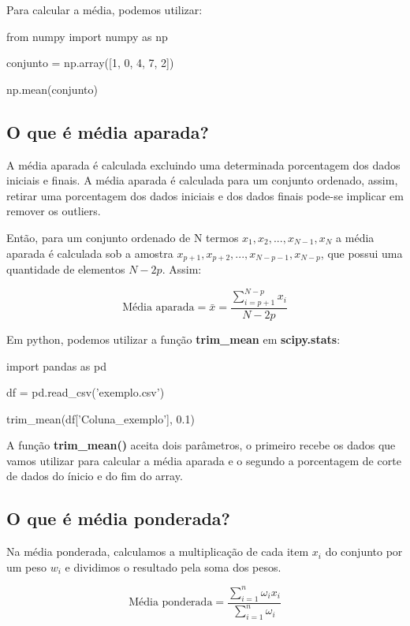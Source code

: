 \documentclass{article}
\begin{document}
Para calcular a média, podemos utilizar:

\begin{pythoncode}
from numpy import numpy as np

conjunto = np.array([1, 0, 4, 7, 2])

np.mean(conjunto)
\end{pythoncode}

\subsection{O que é média aparada?}

A média aparada é calculada excluindo uma determinada porcentagem dos dados iniciais e finais. A média aparada é calculada para um conjunto ordenado, assim, retirar uma porcentagem dos dados iniciais e dos dados finais pode-se implicar em remover os outliers.

Então, para um conjunto ordenado de N termos ${x_1, x_2, ..., x_{N - 1}, x_N}$ a média aparada é calculada sob a amostra ${x_{p + 1}, x_{p + 2}, ..., x_{N - p - 1}, x_{N - p}}$, que possui uma quantidade de elementos $N - 2p$. Assim:

\begin{equation}
    \text{Média \ aparada} = \bar{x} = \frac{\displaystyle \sum_{i = p + 1}^{N - p}x_{i}}{N - 2p}
\end{equation}

Em python, podemos utilizar a função \textbf{trim\_mean} em \textbf{scipy.stats}:

\begin{pythoncode}
import pandas as pd 

df = pd.read_csv('exemplo.csv')

trim_mean(df['Coluna_exemplo'], 0.1)
\end{pythoncode}

A função \textbf{trim\_mean()} aceita dois parâmetros, o primeiro recebe os dados que vamos utilizar para calcular a média aparada e o segundo a porcentagem de corte de dados do ínicio e do fim do array.

\subsection{O que é média ponderada?}

Na média ponderada, calculamos a multiplicação de cada item $x_{i}$ do conjunto por um peso $w_{i}$ e dividimos o resultado pela soma dos pesos.

\begin{equation}
    \text{Média ponderada} = \frac{\displaystyle \sum_{i = 1}^{n} \omega_{i}x_{i}}{\displaystyle \sum_{i = 1}^{n} \omega_{i} }
\end{equation}
\end{document}
